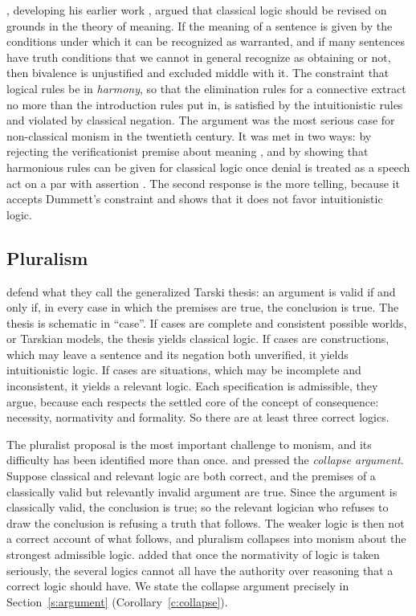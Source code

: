 \documentclass{situationist-preprint}
\begin{document}
\citet{Dummett1991}, developing his earlier work \citep{Dummett1978}, argued that classical logic should be revised on grounds in the theory of meaning. If the meaning of a sentence is given by the conditions under which it can be recognized as warranted, and if many sentences have truth conditions that we cannot in general recognize as obtaining or not, then bivalence is unjustified and excluded middle with it. The constraint that logical rules be in \emph{harmony}, so that the elimination rules for a connective extract no more than the introduction rules put in, is satisfied by the intuitionistic rules and violated by classical negation. The argument was the most serious case for non-classical monism in the twentieth century. It was met in two ways: by rejecting the verificationist premise about meaning \citep{Williamson1994}, and by showing that harmonious rules can be given for classical logic once denial is treated as a speech act on a par with assertion \citep{Rumfitt2000}. The second response is the more telling, because it accepts Dummett's constraint and shows that it does not favor intuitionistic logic.

\subsection{Pluralism}

\citet{BeallRestall2000,BeallRestall2006} defend what they call the generalized Tarski thesis: an argument is valid if and only if, in every case in which the premises are true, the conclusion is true. The thesis is schematic in \enquote{case}. If cases are complete and consistent possible worlds, or Tarskian models, the thesis yields classical logic. If cases are constructions, which may leave a sentence and its negation both unverified, it yields intuitionistic logic. If cases are situations, which may be incomplete and inconsistent, it yields a relevant logic. Each specification is admissible, they argue, because each respects the settled core of the concept of consequence: necessity, normativity and formality. So there are at least three correct logics.

The pluralist proposal is the most important challenge to monism, and its difficulty has been identified more than once. \citet{Priest2006b} and \citet{Read2006} pressed the \emph{collapse argument}. Suppose classical and relevant logic are both correct, and the premises of a classically valid but relevantly invalid argument are true. Since the argument is classically valid, the conclusion is true; so the relevant logician who refuses to draw the conclusion is refusing a truth that follows. The weaker logic is then not a correct account of what follows, and pluralism collapses into monism about the strongest admissible logic. \citet{Keefe2014} added that once the normativity of logic is taken seriously, the several logics cannot all have the authority over reasoning that a correct logic should have. We state the collapse argument precisely in Section~\ref{s:argument} (Corollary~\ref{c:collapse}).
\end{document}
